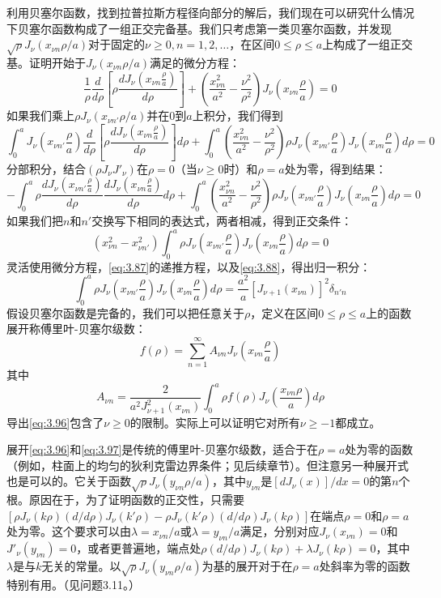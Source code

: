 \documentclass[12pt]{book}
\numberwithin{equation}{chapter}
\numberwithin{figure}{chapter}
\numberwithin{footnote}{page}
\begin{document}
利用贝塞尔函数，找到拉普拉斯方程径向部分的解后，我们现在可以研究什么情况下贝塞尔函数构成了一组正交完备基。我们只考虑第一类贝塞尔函数，并发现$\sqrt{\rho}J_\nu(x_{\nu n}\rho/a)$对于固定的$\nu\geq0, n=1,2,\dots$，在区间$0\leq \rho\leq a$上构成了一组正交基。证明开始于$J_\nu(x_{\nu n}\rho/a)$满足的微分方程：
\begin{equation}\label{eq:3.93}
    \frac{1}{\rho}\frac{d}{d\rho}[\rho\frac{dJ_\nu(x_{\nu n}\frac{\rho}{a})}{d\rho}]+(\frac{x_{\nu n}^2}{a^2}-\frac{\nu^2}{\rho^2})J_\nu(x_{\nu n}\frac{\rho}{a})=0
\end{equation}
如果我们乘上$\rho J_\nu(x_{\nu n'}\rho/a)$并在$0$到$a$上积分，我们得到
$$\int_0^a J_\nu(x_{\nu n'}\frac{\rho}{a})\frac{d}{d\rho}[\rho\frac{dJ_\nu(x_{\nu n}\frac{\rho}{a})}{d\rho}]d\rho+\int_0^a(\frac{x_{\nu n}^2}{a^2}-\frac{\nu^2}{\rho^2})\rho J_\nu(x_{\nu n'}\frac{\rho}{a})J_\nu(x_{\nu n}\frac{\rho}{a})d\rho=0$$
分部积分，结合$(\rho J_\nu J'_\nu)$在$\rho=0$（当$\nu\geq0$时）和$\rho=a$处为零，得到结果：
$$-\int_0^a \rho \frac{dJ_\nu(x_{\nu n'}\frac{\rho}{a})}{d\rho}\frac{dJ_\nu(x_{\nu n}\frac{\rho}{a})}{d\rho}d\rho+\int_0^a (\frac{x_{\nu n}^2}{a^2}-\frac{\nu^2}{\rho^2})\rho J_\nu(x_{\nu n'}\frac{\rho}{a})J_\nu(x_{\nu n}\frac{\rho}{a})d\rho=0$$
如果我们把$n$和$n'$交换写下相同的表达式，两者相减，得到正交条件：
\begin{equation}\label{eq:3.94}
    (x_{\nu n}^2-x_{\nu n'}^2)\int_0^a \rho J_\nu(x_{\nu n'}\frac{\rho}{a})J_\nu(x_{\nu n}\frac{\rho}{a})d\rho=0
\end{equation}
灵活使用微分方程，\autoref{eq:3.87}的递推方程，以及\autoref{eq:3.88}，得出归一积分：
\begin{equation}\label{eq:3.95}
    \int_0^a \rho J_\nu(x_{\nu n'}\frac{\rho}{a})J_\nu(x_{\nu n}\frac{\rho}{a})d\rho=\frac{a^2}{a}[J_{\nu+1}(x_{\nu n})]^2\delta_{n'n}
\end{equation}
假设贝塞尔函数是完备的，我们可以把任意关于$\rho$，定义在区间$0\leq \rho \leq a$上的函数展开称傅里叶-贝塞尔级数：
\begin{equation}\label{eq:3.96}
    f(\rho)=\sum_{n=1}^\infty A_{\nu n}J_\nu(x_{\nu n}\frac{\rho}{a})
\end{equation}
其中
\begin{equation}\label{eq:3.97}
    A_{\nu n}=\frac{2}{a^2J_{\nu+1}^2(x_{\nu n})}\int_0^a \rho f(\rho)J_\nu(\frac{x_{\nu n}\rho}{a})d\rho
\end{equation}
导出\autoref{eq:3.96}包含了$\nu\geq0$的限制。实际上可以证明它对所有$\nu\geq -1$都成立。

展开\autoref{eq:3.96}和\autoref{eq:3.97}是传统的傅里叶-贝塞尔级数，适合于在$\rho=a$处为零的函数（例如，柱面上的均匀的狄利克雷边界条件；见后续章节）。但注意另一种展开式也是可以的。它关于函数$\sqrt{\rho}J_\nu(y_{\nu n}\rho/a)$，其中$y_{\nu n}$是$[dJ_\nu(x)]/dx=0$的第$n$个根。原因在于，为了证明函数的正交性，只需要$[\rho J_\nu(k\rho)(d/d\rho)J_\nu(k'\rho)-\rho J_\nu(k'\rho)(d/d\rho)J_\nu(k\rho)]$在端点$\rho=0$和$\rho=a$处为零。这个要求可以由$\lambda=x_{\nu n}/a$或$\lambda=y_{\nu n}/a$满足，分别对应$J_\nu(x_{\nu n})=0$和$J'_\nu(y_{\nu n})=0$，或者更普遍地，端点处$\rho(d/d\rho)J_\nu(k\rho)+\lambda J_\nu(k\rho)=0$，其中$\lambda$是与$k$无关的常量。以$\sqrt{\rho}J_\nu(y_{\nu n}\rho/a)$为基的展开对于在$\rho=a$处斜率为零的函数特别有用。（见问题3.11。）
\end{document}
